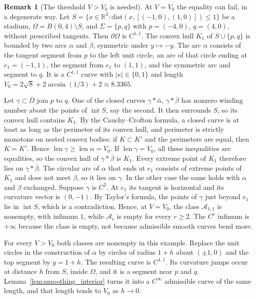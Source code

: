 \documentclass[11pt,reqno]{amsart}
\theoremstyle{definition}
\newtheorem{remark}[theorem]{Remark}
\providecommand{\R}{\mathbb{R}}
\newcommand{\dist}{\mathrm{dist}}
\numberwithin{equation}{section}
\providecommand{\R}{\mathbb{R}}
\begin{document}
\begin{remark}[The threshold $V > V_0$ is needed]
\label{rem:regularity_threshold}
At $V = V_0$ the equality can fail, in a degenerate way. Let $S = \{x \in \R^2 : \dist(x, [(-1,0),(1,0)]) \le 1\}$ be a stadium, $\Omega = B(0,4) \setminus S$, and $\Sigma = \{p, q\}$ with $p = (-4,0)$, $q = (4,0)$, without prescribed tangents. Then $\partial\Omega$ is $C^{1,1}$. The convex hull $K_1$ of $S \cup \{p, q\}$ is bounded by two arcs $\alpha$ and $\beta$, symmetric under $y \mapsto -y$. The arc $\alpha$ consists of the tangent segment from $p$ to the left unit circle, an arc of that circle ending at $e_1 = (-1, 1)$, the segment from $e_1$ to $(1,1)$, and the symmetric arc and segment to $q$. It is a $C^{1,1}$ curve with $|\kappa| \in \{0, 1\}$ and length $V_0 = 2\sqrt8 + 2\arcsin(1/3) + 2 \approx 8.3365$.

Let $\gamma \subset \bar\Omega$ join $p$ to $q$. One of the closed curves $\gamma * \bar\alpha$, $\gamma * \bar\beta$ has nonzero winding number about the points of $\operatorname{int} S$, say the second. It then surrounds $S$, so its convex hull contains $K_1$. By the Cauchy--Crofton formula, a closed curve is at least as long as the perimeter of its convex hull, and perimeter is strictly monotone on nested convex bodies: if $K \subset K'$ and the perimeters are equal, then $K = K'$. Hence $\operatorname{len}\gamma \ge \operatorname{len}\alpha = V_0$. If $\operatorname{len}\gamma = V_0$, all these inequalities are equalities, so the convex hull of $\gamma * \bar\beta$ is $K_1$. Every extreme point of $K_1$ therefore lies on $\gamma * \bar\beta$. The circular arc of $\alpha$ that ends at $e_1$ consists of extreme points of $K_1$ and does not meet $\beta$, so it lies on $\gamma$. In the other case the same holds with $\alpha$ and $\beta$ exchanged. Suppose $\gamma$ is $C^2$. At $e_1$ its tangent is horizontal and its curvature vector is $(0,-1)$. By Taylor's formula, the points of $\gamma$ just beyond $e_1$ lie in $\operatorname{int} S$, which is a contradiction. Hence, at $V = V_0$, the class $\mathcal{A}_{1,1}$ is nonempty, with infimum $1$, while $\mathcal{A}_r$ is empty for every $r \ge 2$. The $C^r$ infimum is $+\infty$ because the class is empty, not because admissible smooth curves bend more.

For every $V > V_0$ both classes are nonempty in this example. Replace the unit circles in the construction of $\alpha$ by circles of radius $1 + h$ about $(\pm1, 0)$ and the top segment by $y = 1 + h$. The resulting curve is $C^{1,1}$. Its curvature jumps occur at distance $h$ from $S$, inside $\Omega$, and it is a segment near $p$ and $q$. Lemma~\ref{lem:smoothing_interior} turns it into a $C^\infty$ admissible curve of the same length, and that length tends to $V_0$ as $h \to 0$.
\end{remark}
\end{document}
